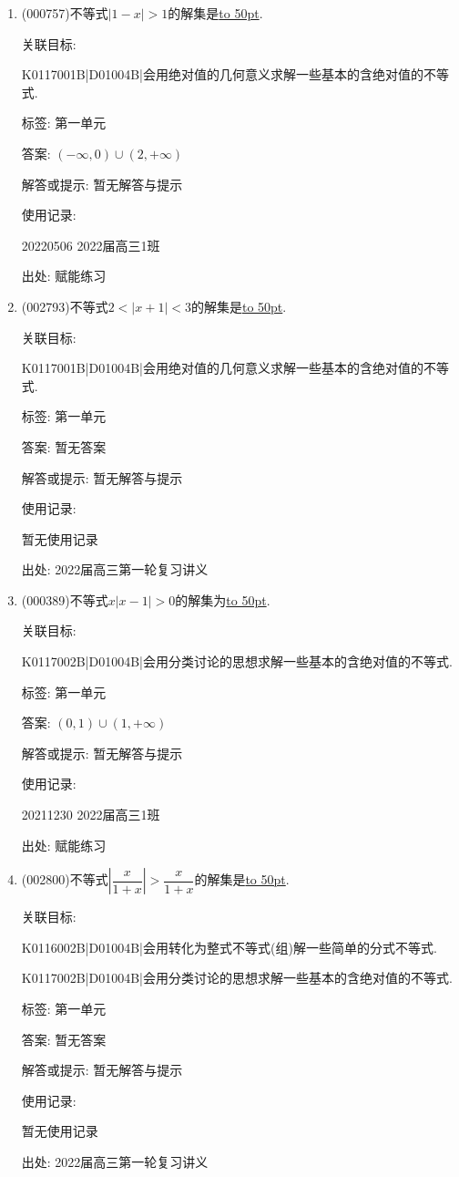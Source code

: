 \documentclass[10pt,a4paper]{article}
\newcommand{\blank}[1]{\underline{\hbox to #1pt{}}}
\begin{document}
\begin{enumerate}[1.]
关联目标:

K0116002B|D01004B|会用转化为整式不等式(组)解一些简单的分式不等式.



标签: 第一单元

答案: 暂无答案

解答或提示: 暂无解答与提示

使用记录:

暂无使用记录


出处: 2022届高三第一轮复习讲义
\item { (000757)}不等式$|1-x|>1$的解集是\blank{50}.


关联目标:

K0117001B|D01004B|会用绝对值的几何意义求解一些基本的含绝对值的不等式.



标签: 第一单元

答案: $(-\infty ,0)\cup (2,+\infty)$

解答或提示: 暂无解答与提示

使用记录:

20220506	2022届高三1班	


出处: 赋能练习
\item { (002793)}不等式$2<|x+1|<3$的解集是\blank{50}.


关联目标:

K0117001B|D01004B|会用绝对值的几何意义求解一些基本的含绝对值的不等式.



标签: 第一单元

答案: 暂无答案

解答或提示: 暂无解答与提示

使用记录:

暂无使用记录


出处: 2022届高三第一轮复习讲义
\item { (000389)}不等式$x|x-1|>0$的解集为\blank{50}.


关联目标:

K0117002B|D01004B|会用分类讨论的思想求解一些基本的含绝对值的不等式.



标签: 第一单元

答案: $(0,1)\cup (1,+\infty)$

解答或提示: 暂无解答与提示

使用记录:

20211230	2022届高三1班	


出处: 赋能练习
\item { (002800)}不等式$|\dfrac x{1+x}|>\dfrac x{1+x}$的解集是\blank{50}.


关联目标:

K0116002B|D01004B|会用转化为整式不等式(组)解一些简单的分式不等式.

K0117002B|D01004B|会用分类讨论的思想求解一些基本的含绝对值的不等式.



标签: 第一单元

答案: 暂无答案

解答或提示: 暂无解答与提示

使用记录:

暂无使用记录


出处: 2022届高三第一轮复习讲义
\end{enumerate}
\end{document}
